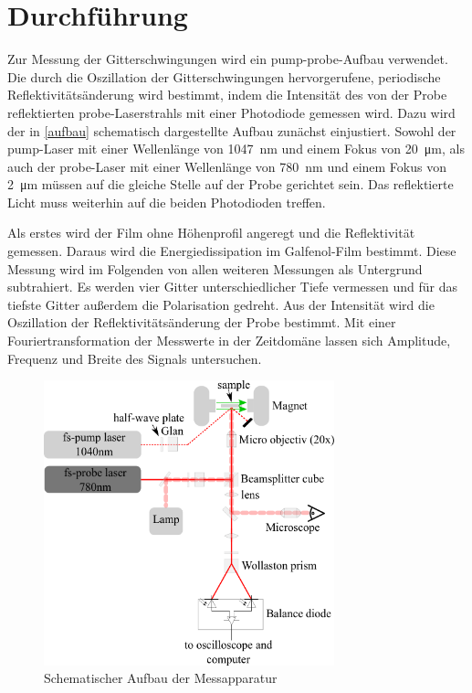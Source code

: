 \section{Durchf\"{u}hrung}

Zur Messung der Gitterschwingungen wird ein pump-probe-Aufbau verwendet. Die durch die Oszillation der Gitterschwingungen hervorgerufene, periodische Reflektivitätsänderung wird bestimmt, indem die Intensität des von der Probe reflektierten probe-Laserstrahls mit einer Photodiode gemessen wird. Dazu wird der in \autoref{aufbau} schematisch dargestellte Aufbau zunächst einjustiert. Sowohl der pump-Laser mit einer Wellenlänge von \SI{1047}{\nano\metre} und einem Fokus von \SI{20}{\micro\metre}, als auch der probe-Laser mit einer Wellenlänge von \SI{780}{\nano\metre} und einem Fokus von \SI{2}{\micro\metre} müssen auf die gleiche Stelle auf der Probe gerichtet sein. Das reflektierte Licht muss weiterhin auf die beiden Photodioden treffen.\par
Als erstes wird der Film ohne Höhenprofil angeregt und die Reflektivität gemessen. Daraus wird die Energiedissipation im Galfenol-Film bestimmt. Diese Messung wird im Folgenden von allen weiteren Messungen als Untergrund subtrahiert. Es werden vier Gitter unterschiedlicher Tiefe vermessen und für das tiefste Gitter außerdem die Polarisation gedreht. Aus der Intensität wird die Oszillation der Reflektivitätsänderung der Probe bestimmt. Mit einer Fouriertransformation der Messwerte in der Zeitdomäne lassen sich Amplitude, Frequenz und Breite des Signals untersuchen.
\begin{figure}
  \centering
  \includegraphics[width=0.75\textwidth]{img/aufbau.png}
  \caption{Schematischer Aufbau der Messapparatur \cite{FP}}
  \label{aufbau}
\end{figure}

\FloatBarrier
